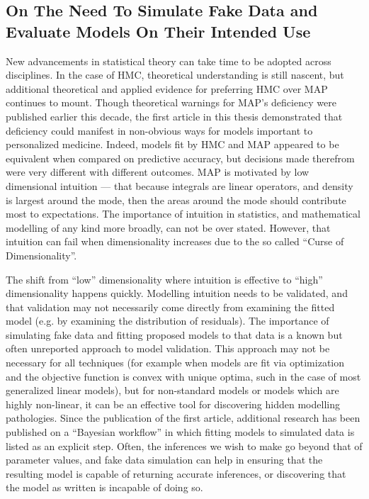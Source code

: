 \subsection{On The Need To Simulate Fake Data and Evaluate Models On Their Intended Use}
New advancements in statistical theory can take time to be adopted across disciplines. In the case of HMC, theoretical understanding is still nascent, but additional theoretical and applied evidence for preferring HMC over MAP continues to mount.  Though theoretical warnings for MAP's deficiency were published earlier this decade, the first article in this thesis demonstrated that deficiency could manifest in non-obvious ways for models important to personalized medicine.  Indeed, models fit by HMC and MAP appeared to be equivalent when compared on predictive accuracy, but decisions made therefrom were very different with different outcomes.  MAP is motivated by low dimensional intuition --- that because integrals are linear operators, and density is largest around the mode, then the areas around the mode should contribute most to expectations.  The importance of intuition in statistics, and mathematical modelling of any kind more broadly, can not be over stated.  However, that intuition can fail when dimensionality increases due to the so called ``Curse of Dimensionality''.

The shift from ``low'' dimensionality where intuition is effective to ``high'' dimensionality happens quickly. Modelling intuition needs to be validated, and that validation may not necessarily come directly from examining the fitted model (e.g. by examining the distribution of residuals).  The importance of simulating fake data and fitting proposed models to that data is a known but often unreported approach to model validation.  This approach may not be necessary for all techniques (for example when models are fit via optimization and the objective function is convex with unique optima, such in the case of most generalized linear models), but for non-standard models or models which are highly non-linear, it can be an effective tool for discovering hidden modelling pathologies.  Since the publication of the first article, additional research has been published on a ``Bayesian workflow''  \cite{gelman_bayesian_2020} in which fitting models to simulated data is listed as an explicit step.  Often, the inferences we wish to make go beyond that of parameter values, and fake data simulation can help in ensuring that the resulting model is capable of returning accurate inferences, or discovering that the model as written is incapable of doing so.


